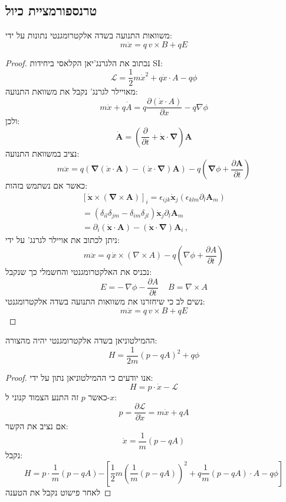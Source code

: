 \documentclass{tstextbook}
\begin{document}
\subsection{טרנספורמציית כיול}

\begin{proposition}
משוואות התנועה בשדה אלקטרומגנטי נתונות על ידי:
$$m{\ddot{x}}=q\,v\times B+q E$$

\end{proposition}
\begin{proof}
נכתוב את הלגרנג'יאן הקלאסי ביחידות SI:
$${\mathcal{L}}={\frac{1}{2}}m{\dot{x}}^{2}+q{\dot{x}}\cdot A-q\phi$$
מאויילר לגרנג' נקבל את משוואת התנועה:
$$m{\ddot{x}}+q{\dot{A}}=q{\frac{\partial({\dot{x}}\cdot A)}{\partial x}}-q\nabla\phi$$
ולכן:
$$\dot{\mathbf{A}}=\left({\frac{\partial}{\partial t}}+{\dot{\mathbf{x}}}\cdot\mathbf{\nabla}\right)\mathbf{A}$$
נציב במשוואת התנועה:
$$m{\ddot{x}}=q\left(\mathbf{\nabla}({\dot{x}}\cdot\mathbf{A})-({\dot{x}}\cdot\mathbf{\nabla})\mathbf{A}\right)-q\left(\mathbf{\nabla}\phi+{\frac{\partial\mathbf{A}}{\partial t}}\right)$$
כאשר אם נשתמש בזהות:
$$\begin{array}{c}{{\left[\dot{\mathbf{x}}\times\left(\mathbf{\nabla}\times\mathbf{A}\right)\right]_{i}=\epsilon_{i j k}\dot{\mathbf{x}}_{j}\left(\epsilon_{k l m}\partial_{l}\mathbf{A}_{m}\right)}}\\ {{=\left(\delta_{i l}\delta_{j m}-\delta_{i m}\delta_{j l}\right)\dot{\mathbf{x}}_{j}\partial_{l}\mathbf{A}_{m}}}\\ {{=\partial_{i}\left(\dot{\mathbf{x}}\cdot\mathbf{A}\right)-\left(\dot{\mathbf{x}}\cdot\mathbf{\nabla}\right)\mathbf{A}_{i}\,,}}\end{array}$$
ניתן לכתוב את אויילר לגרנג' על ידי:
$$m{\ddot{x}}=q\,{\dot{x}}\times(\nabla\times A)-q\left(\nabla\phi+{\frac{\partial A}{\partial t}}\right)$$
נכניס את האלקטרומגנטי והחשמלי כך שנקבל:
$$E=-\,\nabla\phi-\frac{\partial A}{\partial t}\;\;\;\;B=\nabla\times A$$
נשים לב כי שיחזרנו את משוואות התנועה בשדה אלקטרומגנטי:
$$m{\ddot{x}}=q\,v\times B+q E$$

\end{proof}
\begin{proposition}
ההמילטוניאן בשדה אלקטרומגנטי יהיה מהצורה:
$$H=\frac{1}{2m}\left(p-q A\right)^{2}+q\phi$$

\end{proposition}
\begin{proof}
אנו יודעים כי ההמילטוניאן נתון על ידי:
$$H=p\cdot\dot{x}-{\mathcal{L}}$$
כאשר \(p\) זה התנע הצמוד קנוני ל-\(x\):
$$p={\frac{\partial{\mathcal{L}}}{\partial{\dot{x}}}}=m{\dot{x}}+q A$$
אם נציב את הקשר:
$${\dot{x}}={\frac{1}{m}}\left(p-q A\right)$$
נקבל:
$${{H=p\cdot\frac{1}{m}\left(p-q A\right)}} {{-\left[\frac{1}{2}m\left(\frac{1}{m}\left(p-q A\right)\right)^{2}+q\frac{1}{m}\left(p-q A\right)\cdot A-q\phi\right]}}$$
לאחר פישוט נקבל את הטענה

\end{proof}
\end{document}
